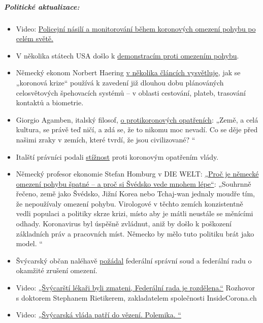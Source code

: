 \hypertarget{politickuxe9-aktualizace-2}{%
\subparagraph{\texorpdfstring{\textbf{Politické
aktualizace:}}{Politické aktualizace:}}\label{politickuxe9-aktualizace-2}}

\begin{itemize}
\tightlist
\item
  Video:
  \href{https://archive.org/details/what-in-the-world-is-actually-going-on-document-reveals-plans-step-by-step}{Policejní
  násilí a monitorování během koronových omezení pohybu po celém světě.}
\item
  V několika státech USA došlo k
  \href{https://news.yahoo.com/protests-draw-thousands-over-state-024328374.html}{demonstracím
  proti omezením pohybu}.
\item
  Německý ekonom Norbert Haering \href{https://norberthaering.de/}{v
  několika článcích vysvětluje}, jak se „koronová krize`` používá k
  zavedení již dlouhou dobu plánováných celosvětových špehovacích
  systémů -- v oblasti cestování, plateb, trasování kontaktů a
  biometrie.
\item
  Giorgio Agamben, italský filosof,
  \href{https://www.nzz.ch/feuilleton/coronavirus-giorgio-agamben-zum-zusammenbruch-der-demokratie-ld.1551896}{o
  protikoronových opatřeních}: „Země, a celá kultura, se právě teď ničí,
  a zdá se, že to nikomu moc nevadí. Co se děje před našimi zraky v
  zemích, které tvrdí, že jsou civilizované? ``
\item
  Italští právníci podali
  \href{https://www.tvprato.it/2020/04/la-camera-civile-degli-avvocati-pratesi-chiede-lannullamento-del-dpcm-del-10-aprile-e-illegittimo/}{stížnost}
  proti koronovým opatřením vlády.
\item
  Německý profesor ekonomie Stefan Homburg v DIE WELT:
  \href{https://www.msn.com/de-de/nachrichten/coronavirus/warum-deutschlands-lockdown-falsch-ist-\%E2\%80\%93-und-schweden-vieles-besser-macht/ar-BB12E6km}{„Proč
  je německé omezení pohybu špatné -- a proč si Švédsko vede mnohem
  lépe``}: „Souhrnně řečeno, země jako Švédsko, Jižní Korea nebo
  Tchaj-wan jednaly moudře tím, že nepoužívaly omezení pohybu.
  Virologové v těchto zemích konzistentně vedli populaci a politiky
  skrze krizi, místo aby je mátli neustále se měnícími odhady.
  Koronavirus byl úspěšně zvládnut, aniž by došlo k poškození základních
  práv a pracovních míst. Německo by mělo tuto politiku brát jako model.
  ``
\item
  Švýcarský občan naléhavě
  \href{https://faktenb-covid-19-massnahmen.jimdofree.com/}{požádal}
  federální správní soud a federální radu o okamžité zrušení omezení.
\item
  Video: \href{https://www.youtube.com/watch?v=eU6IdglI-wc}{„Švýcarští
  lékaři byli zmateni, Federální rada je rozdělena.``} Rozhovor s
  doktorem Stephanem Rietikerem, zakladatelem společnosti
  InsideCorona.ch
\item
  Video: \href{https://www.youtube.com/watch?v=SO2JMkKtq40}{„Švýcarská
  vláda patří do vězení. Polemika. ``}
\end{itemize}

